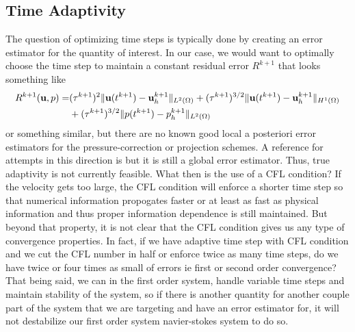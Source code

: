 \documentclass[letterpaper]{erdc}
\begin{document}
\subsection{Time Adaptivity}
The question of optimizing time steps is typically done by creating an error estimator for the quantity of interest.  In our case, we would want to optimally choose the time step to maintain a constant residual error $R^{k+1}$ that looks something like 
\begin{equation}\begin{split}
  R^{k+1}(\textbf{u},p) = &(\tau^{k+1})^2\|\textbf{u}(t^{k+1})-\textbf{u}^{k+1}_h\|_{L^2(\Omega)} + (\tau^{k+1})^{3/2}\|\textbf{u}(t^{k+1})-\textbf{u}^{k+1}_h\|_{H^1(\Omega)} \\&+ (\tau^{k+1})^{3/2}\|p(t^{k+1})-p^{k+1}_h\|_{L^2(\Omega)}\end{split}
  \end{equation}
   or something similar, but there are no known good local a posteriori error estimators for the pressure-correction or projection schemes.  A reference for attempts in this direction is \cite{boyaval2013posteriori} but it is still a global error estimator.  Thus, true adaptivity is not currently feasible.  What then is the use of a CFL condition?  If the velocity gets too large, the CFL condition will enforce a shorter time step so that numerical information propogates faster or at least as fast as physical information and thus proper information dependence is still maintained.  But beyond that property, it is not clear that the CFL condition gives us any type of convergence properties.  In fact, if we have adaptive time step with CFL condition and we cut the CFL number in half or enforce twice as many time steps, do we have twice or four times as small of errors ie first or second order convergence?  That being said, we can in the first order system, handle variable time steps and maintain stability of the system, so if there is another quantity for another couple part of the system that we are targeting and have an error estimator for, it will not destabilize our first order system navier-stokes system to do so.



%
%
%
\end{document}
